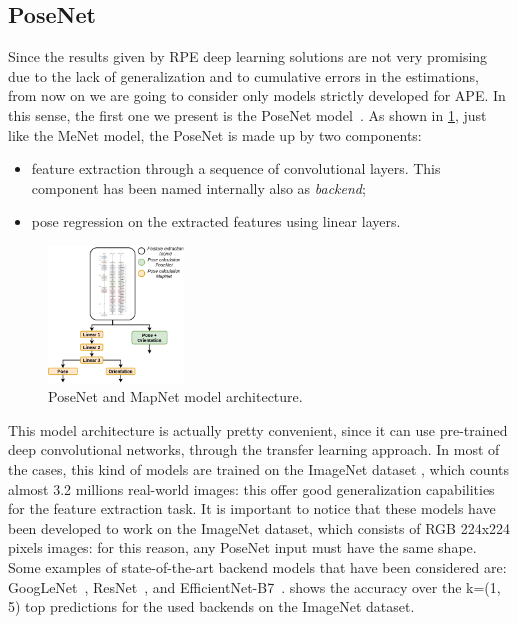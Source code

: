 \subsection{PoseNet}
Since the results given by RPE deep learning solutions are not very promising due to the lack of generalization and to cumulative errors in the estimations, from now on we are going to consider only models strictly developed for APE.
In this sense, the first one we present is the PoseNet model~\cite{9348762}.
As shown in \cref{fig:mapnet-posenet-structure}, just like the MeNet model, the PoseNet is made up by two components:
\begin{itemize}
    \item feature extraction through a sequence of convolutional layers. This component has been named internally also as \emph{backend};
    \item pose regression on the extracted features using linear layers.
\end{itemize}

\begin{figure}[htbp]
    \begin{center}
        \includegraphics[width=0.32\textwidth]{./imgs/mapnet_posenet_structure.png}
    \end{center}
    \caption{PoseNet and MapNet model architecture.}
    \label{fig:mapnet-posenet-structure}
\end{figure}

This model architecture is actually pretty convenient, since it can use pre-trained deep convolutional networks, through the transfer learning approach. In most of the cases, this kind of models are trained on the ImageNet dataset \cite{imagenet}, which counts almost 3.2 millions real-world images: this offer good generalization capabilities for the feature extraction task.
It is important to notice that these models have been developed to work on the ImageNet dataset, which consists of RGB 224x224 pixels images: for this reason, any PoseNet input must have the same shape. 
Some examples of state-of-the-art backend models that have been considered are: GoogLeNet~\cite{googlenet}, ResNet~\cite{resnet}, and EfficientNet-B7~\cite{efficientnet}.  shows the accuracy over the k=(1, 5) top predictions for the used backends on the ImageNet dataset.

